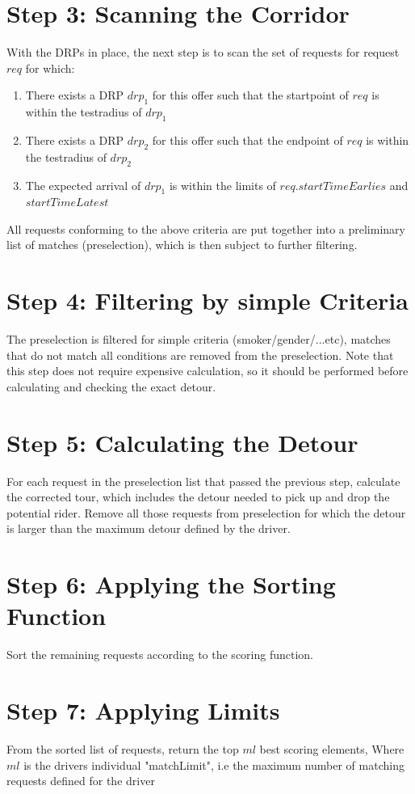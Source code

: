 \section{Step 3: Scanning the Corridor}
With the DRPs in place, the next step is to scan the set of requests for request $req$ for which:

\begin{enumerate}
\item{There exists a DRP $drp_1$ for this offer such that the startpoint of $req$ is within the testradius of $drp_1$ }
\item{There exists a DRP $drp_2$ for this offer such that the endpoint of $req$ is within the testradius of $drp_2$}
\item{The expected arrival of $drp_1$ is within the limits of $req.startTimeEarlies$ and $startTimeLatest$}
\end{enumerate}
All requests conforming to the above criteria are put together into a preliminary 
list of matches (preselection), which is then subject to further filtering.

\section{Step 4: Filtering by simple Criteria}
\label{sfrFilteringSimpleCriteria}
The preselection is filtered for simple criteria (smoker/gender/...etc), matches that do not 
match all conditions are removed from the preselection.
Note that this step does not require expensive calculation, so it should be performed before
calculating and checking the exact detour.
\section{Step 5: Calculating the Detour}
\label{sfrCalculatingDetour}
For each request in the preselection list that passed the previous step, calculate the corrected tour, 
which includes the detour needed to pick up and drop the potential rider.
Remove all those requests from preselection for which the detour is larger than the maximum detour defined by the driver. 	
      
\section{Step 6: Applying the Sorting Function}
\label{sfrSortingFunction}
Sort the remaining requests according to the scoring function.

\section{Step 7: Applying Limits}
\label{sfrApplyingLimits}
From the sorted list of requests, return the top $ml$ best scoring elements,
Where $ml$ is the drivers individual "matchLimit", i.e the maximum number of 
matching requests defined for the driver
      
	
